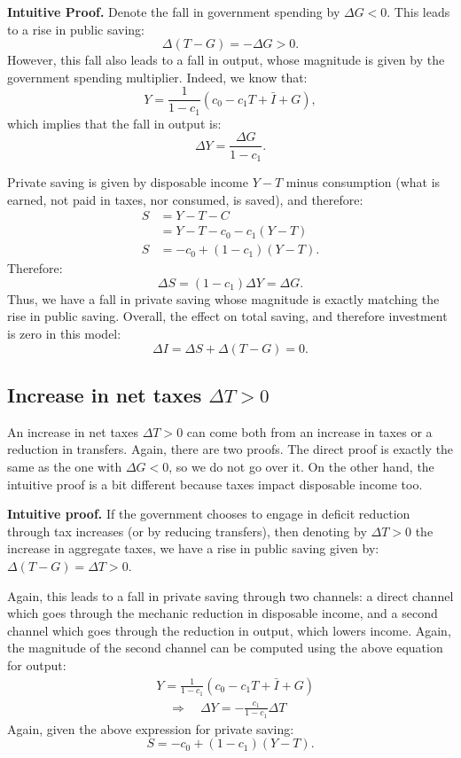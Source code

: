 \documentclass[]{book}
\theoremstyle{definition}
\theoremstyle{definition}
\theoremstyle{definition}
\theoremstyle{remark}
\begin{document}
\textbf{Intuitive Proof.} Denote the fall in government spending by
\(\Delta G<0\). This leads to a rise in public saving:
\[\Delta(T-G)=-\Delta G>0.\] However, this fall also leads to a fall in
output, whose magnitude is given by the government spending multiplier.
Indeed, we know that:
\[Y=\frac{1}{1-c_{1}}\left(c_{0}-c_{1}T+\bar{I}+G\right),\] which
implies that the fall in output is:
\[\Delta Y=\frac{\Delta G}{1-c_{1}}.\]

Private saving is given by disposable income \(Y-T\) minus consumption
(what is earned, not paid in taxes, nor consumed, is saved), and
therefore: \[
\begin{aligned}
S   &= Y-T-C\\
&= Y-T-c_{0}-c_{1}\left(Y-T\right)\\
S   &=-c_{0}+\left(1-c_{1}\right)\left(Y-T\right).
\end{aligned}
\] Therefore: \[\Delta S=(1-c_{1})\Delta Y=\Delta G.\] Thus, we have a
fall in private saving whose magnitude is exactly matching the rise in
public saving. Overall, the effect on total saving, and therefore
investment is zero in this model: \[\Delta I  =\Delta S+\Delta(T-G)=0.\]

\subsection{\texorpdfstring{Increase in net taxes
\(\Delta T>0\)}{Increase in net taxes \textbackslash{}Delta T\textgreater{}0}}\label{increase-in-net-taxes-delta-t0}

An increase in net taxes \(\Delta T>0\) can come both from an increase
in taxes or a reduction in transfers. Again, there are two proofs. The
direct proof is exactly the same as the one with \(\Delta G<0\), so we
do not go over it. On the other hand, the intuitive proof is a bit
different because taxes impact disposable income too.

\textbf{Intuitive proof.} If the government chooses to engage in deficit
reduction through tax increases (or by reducing transfers), then
denoting by \(\Delta T>0\) the increase in aggregate taxes, we have a
rise in public saving given by: \(\Delta(T-G)=\Delta T>0\).

Again, this leads to a fall in private saving through two channels: a
direct channel which goes through the mechanic reduction in disposable
income, and a second channel which goes through the reduction in output,
which lowers income. Again, the magnitude of the second channel can be
computed using the above equation for output: \[
\begin{aligned}
&Y=\frac{1}{1-c_{1}}\left(c_{0}-c_{1}T+\bar{I}+G\right)\\
&\quad\Rightarrow\quad\Delta Y=-\frac{c_{1}}{1-c_{1}}\Delta T
\end{aligned}
\] Again, given the above expression for private saving:
\[S=-c_{0}+\left(1-c_{1}\right)\left(Y-T\right).\]
\end{document}
